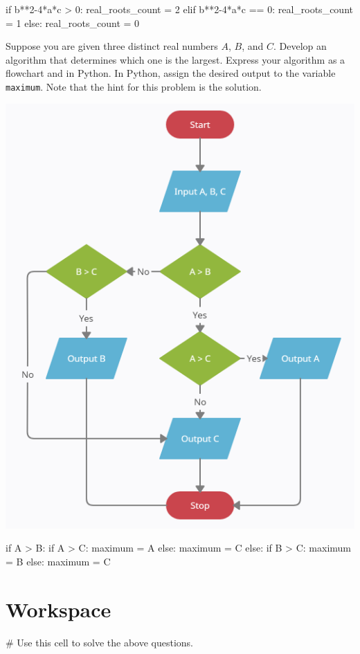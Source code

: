 \documentclass{ximera}
\begin{document}
\begin{question}
\begin{hint}
\begin{center}
		\end{center}
\begin{sageCell}
if b**2-4*a*c > 0:
	real_roots_count = 2
elif b**2-4*a*c == 0:
	real_roots_count = 1
else:
	real_roots_count = 0
\end{sageCell}
	\end{hint}
\end{question}

\begin{question}
	Suppose you are given three distinct real numbers $A$, $B$, and $C$. Develop an algorithm that determines which one is the largest. Express your algorithm as a flowchart and in Python. In Python, assign the desired output to the variable \verb|maximum|. Note that the hint for this problem is the solution.
	\begin{hint}
		\begin{center}
			\includegraphics{maxof3.png}
		\end{center}
\begin{sageCell}
if A > B:
        if A > C:
                maximum = A
        else:
                maximum = C
else:
        if B > C:
                maximum = B
        else:
                maximum = C
\end{sageCell}
	\end{hint}
\end{question}

\section{Workspace}

\begin{sageCell}
# Use this cell to solve the above questions.
\end{sageCell}
\end{document}
